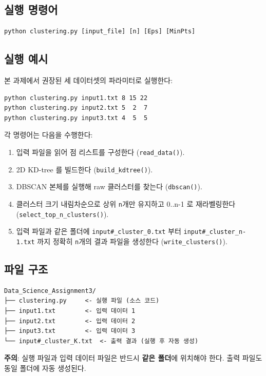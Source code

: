 \documentclass[12pt, a4paper]{article}
\begin{document}
\subsection{실행 명령어}

\begin{verbatim}
python clustering.py [input_file] [n] [Eps] [MinPts]
\end{verbatim}

\subsection{실행 예시}

본 과제에서 권장된 세 데이터셋의 파라미터로 실행한다:

\begin{verbatim}
python clustering.py input1.txt 8 15 22
python clustering.py input2.txt 5  2  7
python clustering.py input3.txt 4  5  5
\end{verbatim}

각 명령어는 다음을 수행한다:
\begin{enumerate}
    \item 입력 파일을 읽어 점 리스트를 구성한다 (\texttt{read\_data()}).
    \item 2D KD-tree 를 빌드한다 (\texttt{build\_kdtree()}).
    \item DBSCAN 본체를 실행해 raw 클러스터를 찾는다 (\texttt{dbscan()}).
    \item 클러스터 크기 내림차순으로 상위 \texttt{n}개만 유지하고 0..n-1 로 재라벨링한다 (\texttt{select\_top\_n\_clusters()}).
    \item 입력 파일과 같은 폴더에 \texttt{input\#\_cluster\_0.txt} 부터 \texttt{input\#\_cluster\_n-1.txt} 까지 정확히 \texttt{n}개의 결과 파일을 생성한다 (\texttt{write\_clusters()}).
\end{enumerate}

\subsection{파일 구조}

\begin{verbatim}
Data_Science_Assignment3/
├── clustering.py     <- 실행 파일 (소스 코드)
├── input1.txt        <- 입력 데이터 1
├── input2.txt        <- 입력 데이터 2
├── input3.txt        <- 입력 데이터 3
└── input#_cluster_K.txt  <- 출력 결과 (실행 후 자동 생성)
\end{verbatim}

\noindent\textbf{주의}: 실행 파일과 입력 데이터 파일은 반드시 \textbf{같은 폴더}에 위치해야 한다. 출력 파일도 동일 폴더에 자동 생성된다.
\end{document}
